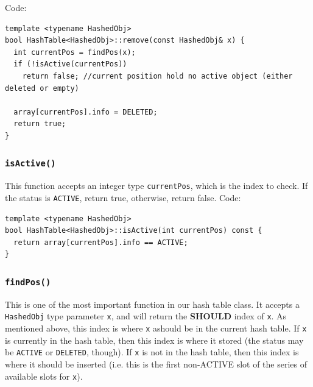 \documentclass[11pt]{book}
\begin{document}
Code:
\begin{verbatim}
template <typename HashedObj>
bool HashTable<HashedObj>::remove(const HashedObj& x) {
  int currentPos = findPos(x);
  if (!isActive(currentPos))
    return false; //current position hold no active object (either deleted or empty)

  array[currentPos].info = DELETED;
  return true;
}
\end{verbatim}

\subsubsection{\texttt{isActive()}}
\label{sec:orge52fd77}
This function accepts an integer type \texttt{currentPos}, which is the index to check. If the status is \texttt{ACTIVE}, return true, otherwise, return false. Code:
\begin{verbatim}
template <typename HashedObj>
bool HashTable<HashedObj>::isActive(int currentPos) const {
  return array[currentPos].info == ACTIVE;
}
\end{verbatim}

\subsubsection{\texttt{findPos()}}
\label{sec:orgd9e6b74}
This is one of the most important function in our hash table class. It accepts a \texttt{HashedObj} type parameter \texttt{x}, and will return the \textbf{SHOULD} index of \texttt{x}. As mentioned above, this index is where \texttt{x} ashould be in the current hash table. If \texttt{x} is currently in the hash table, then this index is where it stored (the status may be \texttt{ACTIVE} or \texttt{DELETED}, though). If \texttt{x} is not in the hash table, then this index is where it should be inserted (i.e. this is the first non-ACTIVE slot of the series of available slots for \texttt{x}).
\end{document}
